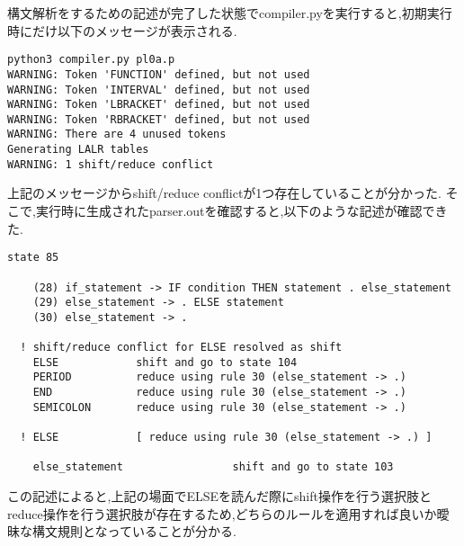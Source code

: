 \documentclass[main]{subfiles}
\begin{document}
構文解析をするための記述が完了した状態でcompiler.pyを実行すると,初期実行時にだけ以下のメッセージが表示される.
\begin{oframed}
\begin{verbatim}
python3 compiler.py pl0a.p
WARNING: Token 'FUNCTION' defined, but not used
WARNING: Token 'INTERVAL' defined, but not used
WARNING: Token 'LBRACKET' defined, but not used
WARNING: Token 'RBRACKET' defined, but not used
WARNING: There are 4 unused tokens
Generating LALR tables
WARNING: 1 shift/reduce conflict
\end{verbatim}
\end{oframed}

上記のメッセージからshift/reduce conflictが1つ存在していることが分かった.
そこで,実行時に生成されたparser.outを確認すると,以下のような記述が確認できた.
\begin{oframed}
\begin{verbatim}
state 85

    (28) if_statement -> IF condition THEN statement . else_statement
    (29) else_statement -> . ELSE statement
    (30) else_statement -> .

  ! shift/reduce conflict for ELSE resolved as shift
    ELSE            shift and go to state 104
    PERIOD          reduce using rule 30 (else_statement -> .)
    END             reduce using rule 30 (else_statement -> .)
    SEMICOLON       reduce using rule 30 (else_statement -> .)

  ! ELSE            [ reduce using rule 30 (else_statement -> .) ]

    else_statement                 shift and go to state 103
\end{verbatim}
\end{oframed}
この記述によると,上記の場面でELSEを読んだ際にshift操作を行う選択肢とreduce操作を行う選択肢が存在するため,どちらのルールを適用すれば良いか曖昧な構文規則となっていることが分かる.
\end{document}
